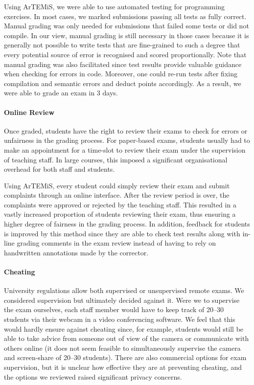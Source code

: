 Using ArTEMiS, we were able to use automated testing for programming exercises.
In most cases, we marked submissions passing all tests as fully correct.
Manual grading was only needed for submissions that failed some tests or did not compile.
In our view, manual grading is still necessary in those cases because it is generally not possible to write tests that are fine-grained to such a degree that every potential source of error is recognised and scored proportionally.
Note that manual grading was also facilitated since test results provide valuable guidance when checking for errors in code.
Moreover, one could re-run tests after fixing compilation and semantic errors and deduct points accordingly.
As a result, we were able to grade an exam in 3 days.

\paragraph{Online Review}

Once graded, students have the right to review their
exams to check for errors or unfairness in the grading process.
For paper-based exams, students usually had to make an
appointment for a time-slot to review their exam under
the supervision of teaching staff.
In large courses, this imposed a significant organisational overhead for both staff and students.

Using ArTEMiS, every student could simply review their exam and submit complaints through an online interface.
After the review period is over,
the complaints were approved or rejected by the teaching staff.
This resulted in a vastly increased proportion of students reviewing their exam,
thus ensuring a higher degree of fairness in the grading process.
In addition, feedback for students is improved by this method since they are able to check test results along with in-line grading comments in the exam review instead of having to rely on handwritten annotations made by the corrector.

\paragraph{Cheating}

University regulations allow both supervised or unsupervised remote exams.
We considered supervision but ultimately decided against it. Were we to supervise the exam ourselves,
each staff member would have to keep track of 20--30 students via their webcam in a video conferencing software.
We feel that this would hardly ensure against cheating
since, for example, students would still be able to take advice from someone out of view of the camera or communicate with others online (it does not seem feasible to simultaneously supervise the camera and screen-share of 20--30 students).
There are also commercial options for exam supervision,
but it is unclear how effective they are at preventing cheating, and the options we reviewed raised significant privacy concerns.

